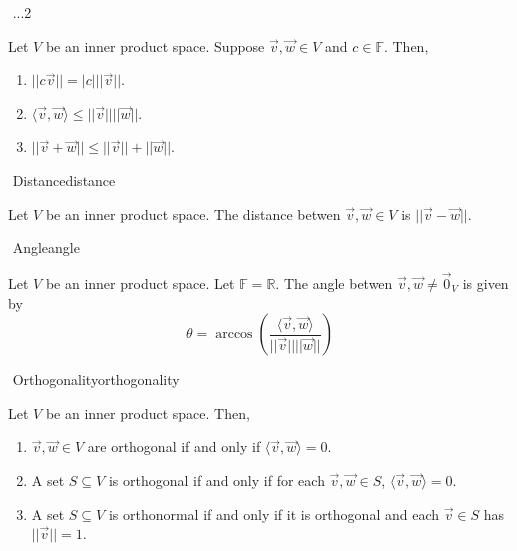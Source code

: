         \begin{theorem}{\Stop\,\,}{...2}
            
            Let \(V\) be an inner product space. Suppose \(\vec{v},\vec{w}\in V\) and \(c\in\mathbb{F}\). Then,
            \begin{enumerate}
                \item \(||c\vec{v}||=|c|||\vec{v}||\).
                \item \(\langle \vec{v},\vec{w}\rangle\leq ||\vec{v}||||\vec{w}||\).
                \item \(||\vec{v}+\vec{w}||\leq||\vec{v}||+||\vec{w}||\).
            \end{enumerate}

        \end{theorem}
        \begin{definition}{\Stop\,\,Distance}{distance}

            Let \(V\) be an inner product space. The distance betwen \(\vec{v},\vec{w}\in V\) is \(||\vec{v}-\vec{w}||\).
            
        \end{definition}
        \begin{definition}{\Stop\,\,Angle}{angle}

            Let \(V\) be an inner product space. Let \(\mathbb{F}=\mathbb{R}\). The angle betwen \(\vec{v},\vec{w}\neq\vec{0}_V\) is given by
            \begin{equation*}
                \theta =\arccos\left(\frac{\langle\vec{v},\vec{w}\rangle}{||\vec{v}||||\vec{w}||}\right)
            \end{equation*}
            
        \end{definition}
        \begin{definition}{\Stop\,\,Orthogonality}{orthogonality}

            Let \(V\) be an inner product space. Then, 
            \begin{enumerate}
                \item \(\vec{v},\vec{w}\in V\) are orthogonal if and only if \(\langle\vec{v},\vec{w}\rangle=0\).
                \item A set \(S\subseteq V\) is orthogonal if and only if for each \(\vec{v},\vec{w}\in S\), \(\langle\vec{v},\vec{w}\rangle=0\).
                \item A set \(S\subseteq V\) is orthonormal if and only if it is orthogonal and each \(\vec{v}\in S\) has \(||\vec{v}||=1\).
            \end{enumerate}

        \end{definition}
